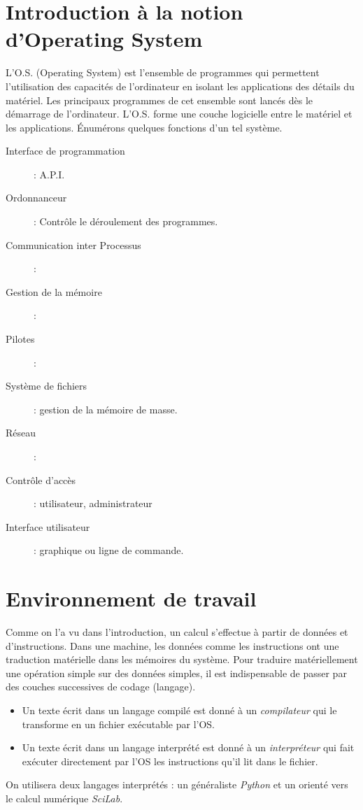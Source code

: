 \section{Introduction à la notion d'Operating System}
L'O.S. (Operating System) est l'ensemble de programmes qui permettent l'utilisation des capacités de l'ordinateur en isolant les applications des détails du matériel. Les principaux programmes de cet ensemble sont lancés dès le démarrage de l'ordinateur. L'O.S. forme une couche logicielle entre le matériel et les applications. \'Enumérons quelques fonctions d'un tel système.
\begin{description}
 \item[Interface de programmation]: A.P.I.
 \item[Ordonnanceur]: Contrôle le déroulement des programmes.
 \item[Communication inter Processus]:
 \item[Gestion de la mémoire]:
 \item[Pilotes]:
 \item[Système de fichiers]: gestion de la mémoire de masse.
 \item[Réseau]:
 \item[Contrôle d'accès]: utilisateur, administrateur
 \item[Interface utilisateur]: graphique ou ligne de commande.
\end{description}

\section{Environnement de travail}
Comme on l'a vu dans l'introduction, un calcul s'effectue à partir de données et d'instructions. Dans une machine, les données comme les instructions ont une traduction matérielle dans les mémoires du système. Pour traduire matériellement une opération simple sur des données simples, il est indispensable de passer par des couches successives de codage (langage).
\begin{itemize}
 \item Un texte écrit dans un langage compilé est donné à un \emph{compilateur} qui le transforme en un fichier exécutable par l'OS.
 \item Un texte écrit dans un langage interprété est donné à un \emph{interpréteur} qui fait exécuter directement par l'OS les instructions qu'il lit dans le fichier.
\end{itemize}
On utilisera deux langages interprétés : un généraliste \emph{Python} et un orienté vers le calcul numérique \emph{SciLab}.

